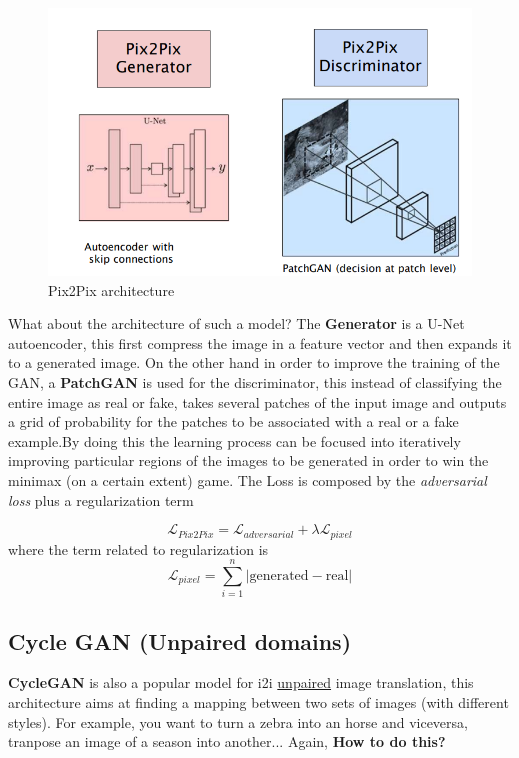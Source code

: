 \begin{figure}
    \centering
    \includegraphics[scale=0.6]{img/pix2pix_arch.png}
    \caption{Pix2Pix architecture}
\end{figure}
What about the architecture of such a model? The \textbf{Generator} is a U-Net autoencoder, this first compress the image in a feature vector and then expands it to a generated image. On the other hand in order to improve the training of the GAN, a  \textbf{PatchGAN} is used for the discriminator, this instead of classifying the entire  image as real or fake, takes several patches of the input image and outputs a grid of probability for the patches to be associated with a real or a fake example.By doing this the learning process can be focused into iteratively improving particular regions of the images to be generated in order to win the minimax (on a certain extent) game. The Loss is composed by the \textit{adversarial loss} plus a regularization term

\begin{equation*}
    \mathcal{L}_{Pix2Pix} = 
    \mathcal{L}_{adversarial} + \lambda \mathcal{L}_{pixel}
\end{equation*}
where the term related to regularization is
\begin{equation*}
    \mathcal{L}_{pixel} = \sum_{i=1}^n \vert \text{generated}-\text{real} \vert
\end{equation*}

\subsection{Cycle GAN (Unpaired domains)}
\textbf{CycleGAN} is also a popular model for i2i \underline{unpaired} image translation, this architecture aims at finding a mapping between two sets of images (with different styles). For example, you want to turn a zebra into an horse and viceversa, tranpose an image of a season into another... Again, \textbf{How to do this?}

